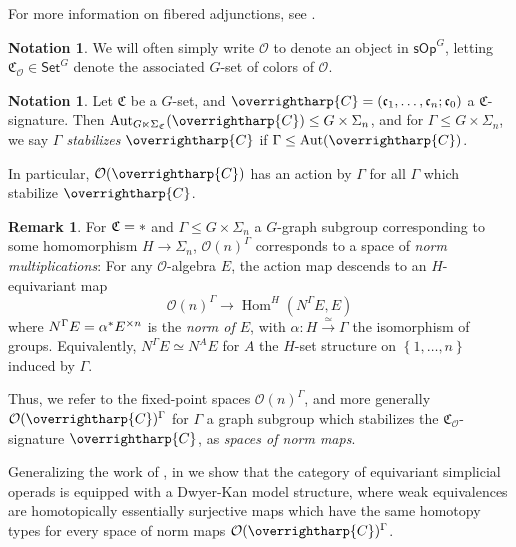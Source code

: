 \documentclass[a4paper,10pt
,draft
]{article}%
\numberwithin{equation}{section}
\numberwithin{figure}{section}
\theoremstyle{definition} %
\newtheorem{remark}[equation]{Remark}%
\newtheorem{notation}[equation]{Notation}%
\newcommand{\set}[1]{\left\{#1\right\}}%
\newcommand{\longto}{\longrightarrow}%
\newcommand{\vect}[1]{\text{\overrightharp{\ensuremath{#1}}}}
\newcommand{\Set}{\ensuremath{\mathsf{Set}}}
\newcommand{\sOp}{\ensuremath{\mathsf{sOp}}}%
\DeclareMathOperator{\Hom}{Hom}%
\DeclareMathOperator{\Aut}{Aut}%
\renewcommand{\O}{\ensuremath{\mathcal O}}
\newcommand{\1}{\ensuremath{\mathbbm 1}}%
\begin{document}
For more information on fibered adjunctions, see \cite[\S 2.2]{BP_HGOP}.


\begin{notation}
      We will often simply write $\O$ to denote an object in $\sOp^G$,
      letting $\mathfrak C_\O \in \Set^G$ denote the associated $G$-set of colors of $\O$.
\end{notation}

\begin{notation}
      Let $\mathfrak C$ be a $G$-set, and $\vect C = (\mathfrak c_1, \dots, \mathfrak c_n; \mathfrak c_0)$ a $\mathfrak C$-signature.
      Then $\Aut_{G \ltimes \Sigma_{\mathfrak C}}(\vect C) \leq G \times \Sigma_n$,
      and for $\Gamma \leq G \times \Sigma_n$, we say \textit{$\Gamma$ stabilizes $\vect C$} if $\Gamma \leq \Aut(\vect C)$.

      In particular, $\O(\vect C)$ has an action by $\Gamma$ for all $\Gamma$ which stabilize $\vect C$.
\end{notation}

{\color{OliveGreen} %
  \begin{remark}
        For $\mathfrak C = \**$ and $\Gamma \leq G \times \Sigma_n$ a $G$-graph subgroup corresponding to some homomorphism $H \to \Sigma_n$,
        $\O(n)^{\Gamma}$ corresponds to a space of \textit{norm multiplications}:
        For any $\O$-algebra $E$, the action map descends to an $H$-equivariant map
        \[
              \O(n)^{\Gamma} \longto \Hom^H(N^\Gamma E, E)
        \]
        where $N^\Gamma E = \alpha^{\**}E^{\times n}$ is the \textit{norm of $E$}, with $\alpha \colon H \xrightarrow{\simeq} \Gamma$ the isomorphism of groups.
        Equivalently, $N^\Gamma E \simeq N^A E$ for $A$ the $H$-set structure on $\set{1,\dots, n}$ induced by $\Gamma$.

        Thus, we refer to the fixed-point spaces $\O(n)^\Gamma$,
        and more generally $\O(\vect C)^\Gamma$ for $\Gamma$ a graph subgroup which stabilizes the $\mathfrak C_\O$-signature $\vect C$,
        as \textit{spaces of norm maps}.
  \end{remark}
} %

Generalizing the work of \cite{Ber07b,CM13b}, in \cite{BP_HGOP} we show that
the category of equivariant simplicial operads is equipped with a Dwyer-Kan model structure,
where weak equivalences are homotopically essentially surjective maps which have the same homotopy types for every space of norm maps $\O(\vect C)^\Gamma$.
\end{document}
